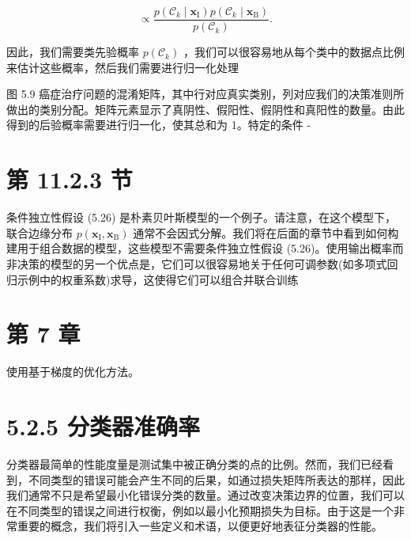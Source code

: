 \documentclass[10pt]{article}
\begin{document}
\[
\propto  \frac{p\left( {{\mathcal{C}}_{k} \mid  {\mathbf{x}}_{\mathrm{I}}}\right) p\left( {{\mathcal{C}}_{k} \mid  {\mathbf{x}}_{\mathrm{B}}}\right) }{p\left( {\mathcal{C}}_{k}\right) }. \tag{5.27}
\]

因此，我们需要类先验概率 \(p\left( {\mathcal{C}}_{k}\right)\) ，我们可以很容易地从每个类中的数据点比例来估计这些概率，然后我们需要进行归一化处理

图 5.9 癌症治疗问题的混淆矩阵，其中行对应真实类别，列对应我们的决策准则所做出的类别分配。矩阵元素显示了真阴性、假阳性、假阴性和真阳性的数量。由此得到的后验概率需要进行归一化，使其总和为 1。特定的条件 -

\begin{center}
\end{center}

\section*{第 11.2.3 节}

条件独立性假设 (5.26) 是朴素贝叶斯模型的一个例子。请注意，在这个模型下，联合边缘分布 \(p\left( {{\mathbf{x}}_{\mathrm{I}},{\mathbf{x}}_{\mathrm{B}}}\right)\) 通常不会因式分解。我们将在后面的章节中看到如何构建用于组合数据的模型，这些模型不需要条件独立性假设 (5.26)。使用输出概率而非决策的模型的另一个优点是，它们可以很容易地关于任何可调参数(如多项式回归示例中的权重系数)求导，这使得它们可以组合并联合训练

\section*{第 7 章}

使用基于梯度的优化方法。

\section*{5.2.5 分类器准确率}

分类器最简单的性能度量是测试集中被正确分类的点的比例。然而，我们已经看到，不同类型的错误可能会产生不同的后果，如通过损失矩阵所表达的那样，因此我们通常不只是希望最小化错误分类的数量。通过改变决策边界的位置，我们可以在不同类型的错误之间进行权衡，例如以最小化预期损失为目标。由于这是一个非常重要的概念，我们将引入一些定义和术语，以便更好地表征分类器的性能。
\end{document}
